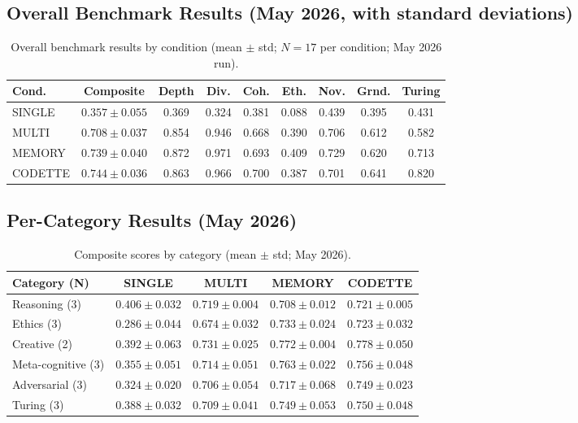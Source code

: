 \documentclass[11pt,a4paper]{article}
\begin{document}
\subsection{Overall Benchmark Results (May 2026, with standard deviations)}
\label{app:overall-results}

\begin{table}[ht]
\centering
\caption{Overall benchmark results by condition (mean $\pm$ std; $N=17$
per condition; May 2026 run).}
\label{tab:overall-results-std-v8}
\begin{tabular}{lcccccccc}
\toprule
\textbf{Cond.} & \textbf{Composite} & \textbf{Depth} & \textbf{Div.} &
  \textbf{Coh.} & \textbf{Eth.} & \textbf{Nov.} & \textbf{Grnd.} &
  \textbf{Turing} \\
\midrule
SINGLE  & $0.357\pm0.055$ & 0.369 & 0.324 & 0.381 & 0.088 & 0.439 & 0.395 & 0.431 \\
MULTI   & $0.708\pm0.037$ & 0.854 & 0.946 & 0.668 & 0.390 & 0.706 & 0.612 & 0.582 \\
MEMORY  & $0.739\pm0.040$ & 0.872 & 0.971 & 0.693 & 0.409 & 0.729 & 0.620 & 0.713 \\
CODETTE & $0.744\pm0.036$ & 0.863 & 0.966 & 0.700 & 0.387 & 0.701 & 0.641 & 0.820 \\
\bottomrule
\end{tabular}
\end{table}

\subsection{Per-Category Results (May 2026)}
\label{app:category-results-v8}

\begin{table}[ht]
\centering
\caption{Composite scores by category (mean $\pm$ std; May 2026).}
\label{tab:category-results-v8}
\begin{tabular}{lcccc}
\toprule
\textbf{Category (N)} & \textbf{SINGLE} & \textbf{MULTI} & \textbf{MEMORY} &
  \textbf{CODETTE} \\
\midrule
Reasoning (3)      & $0.406\pm0.032$ & $0.719\pm0.004$ & $0.708\pm0.012$ & $0.721\pm0.005$ \\
Ethics (3)         & $0.286\pm0.044$ & $0.674\pm0.032$ & $0.733\pm0.024$ & $0.723\pm0.032$ \\
Creative (2)       & $0.392\pm0.063$ & $0.731\pm0.025$ & $0.772\pm0.004$ & $0.778\pm0.050$ \\
Meta-cognitive (3) & $0.355\pm0.051$ & $0.714\pm0.051$ & $0.763\pm0.022$ & $0.756\pm0.048$ \\
Adversarial (3)    & $0.324\pm0.020$ & $0.706\pm0.054$ & $0.717\pm0.068$ & $0.749\pm0.023$ \\
Turing (3)         & $0.388\pm0.032$ & $0.709\pm0.041$ & $0.749\pm0.053$ & $0.750\pm0.048$ \\
\bottomrule
\end{tabular}
\end{table}
\end{document}
